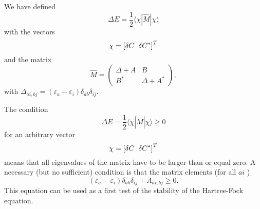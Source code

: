\documentclass[%
oneside,                 %
final,                   %
10pt]{article}
\begin{document}
We have defined 
\[
\Delta E = \frac{1}{2} \langle \chi | \hat{M}| \chi \rangle
\]
with the vectors 
\[ 
\chi = \left[ \delta C\hspace{0.2cm} \delta C^*\right]^T
\]
and the matrix 
\[
\hat{M}=\left(\begin{array}{cc} \Delta + A & B \\ B^* & \Delta + A^*\end{array}\right),
\]
with $\Delta_{ai,bj} = (\varepsilon_a-\varepsilon_i)\delta_{ab}\delta_{ij}$.

The condition
\[
\Delta E = \frac{1}{2} \langle \chi | \hat{M}| \chi \rangle \ge 0
\]
for an arbitrary  vector 
\[ 
\chi = \left[ \delta C\hspace{0.2cm} \delta C^*\right]^T
\]
means that all eigenvalues of the matrix have to be larger than or equal zero. 
A necessary (but no sufficient) condition is that the matrix elements (for all $ai$ )
\[
(\varepsilon_a-\varepsilon_i)\delta_{ab}\delta_{ij}+A_{ai,bj} \ge 0.
\]
This equation can be used as a first test of the stability of the Hartree-Fock equation.


\end{document}
